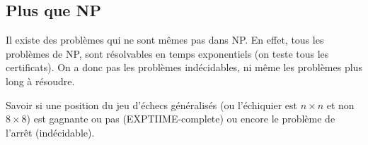 \subsection{Plus que NP}

Il existe des problèmes qui ne sont mêmes pas dans NP. En effet, tous les problèmes de NP, sont résolvables en temps exponentiels (on teste tous les certificats). On a donc pas les problèmes indécidables, ni même les problèmes plus long à résoudre.

\begin{example}
	Savoir si une position du jeu d'échecs généralisés (ou l'échiquier est $n \times n$ et non $8 \times 8$) est gagnante ou pas (EXPTIIME-complete) ou encore le problème de l'arrêt (indécidable).
\end{example}